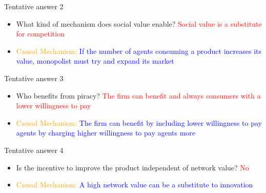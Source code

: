 \documentclass{beamer}
\numberwithin{equation}{section}
\begin{document}
\begin{frame}{Tentative answer 2}
\begin{itemize}
    \item What kind of mechanism does social value enable? \textcolor{red}{Social value is a substitute for competition}
    \item \textcolor{orange}{Causal Mechanism:} \textcolor{blue}{If the number of agents consuming a product increases its value, monopolist must try and expand its market}
\end{itemize}
\end{frame}
\begin{frame}{Tentative answer 3}
\begin{itemize}
    \item Who benefits from piracy?  \textcolor{red}{The firm can benefit and always consumers with a lower willingness to pay}
    \item \textcolor{orange}{Causal Mechanism:} \textcolor{blue}{The firm can benefit by including lower willingness to pay agents by charging higher willingness to pay agents more}
\end{itemize}
\end{frame}
\begin{frame}{Tentative answer 4}
\begin{itemize}
    \item Is the incentive to improve the product independent of network value? \textcolor{red}{No}
    \item \textcolor{orange}{Causal Mechanism:} \textcolor{blue}{A high network value can be a substitute to innovation}
\end{itemize}
\end{frame}
\end{document}
